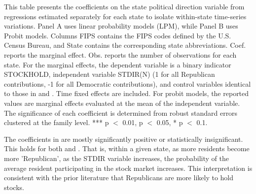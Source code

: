 \begin{table}
    \centering
    \caption{Stock Market Participation and State Politics By State}
    \label{tab:7}
    \small 

    \begin{minipage}{\textheight}
        This table presents the coefficients on the state political direction variable from regressions estimated separately for each state to isolate within-state time-series variations. Panel A uses linear probability models (LPM), while Panel B uses Probit models. Columns FIPS contains the FIPS codes defined by the U.S. Census Bureau, and State contains the corresponding state abbreviations. Coef. reports the marginal effect. Obs. reports the number of observations for each state. For the marginal effects, the dependent variable is a binary indicator STOCKHOLD, independent variable STDIR(N) (1 for all Republican contributions, -1 for all Democratic contributions), and control variables identical to those in  and . Time fixed effects are included. For probit models, the reported values are marginal effects evaluated at the mean of the independent variable. The significance of each coefficient is determined from robust standard errors clustered at the family level. *** p $<$ 0.01,  p $<$ 0.05, * p $<$ 0.1.
    \end{minipage}

    \vspace{1ex}
    
    \begin{subtable}{\textwidth}
        \caption{Linear Probability Model (LPM)}
        \label{tab:7a}
        
    \end{subtable}
\end{table}

\begin{table}
    \ContinuedFloat
    \centering

    \caption[]{Stock Market Participation and State Politics By State (Cont.)}
    
    \small
    
    \begin{subtable}{\textwidth}
        \caption{Probit Model}
        \label{tab:7b}
        
    \end{subtable}
\end{table}


The coefficients in  are mostly significantly positive or statistically insignificant. This holds for both   and  . That is, within a given state, as more residents become more 'Republican', as the STDIR variable increases, the probability of the average resident participating in the stock market increases. This interpretation is consistent with the prior literature that Republicans are more likely to hold stocks.

